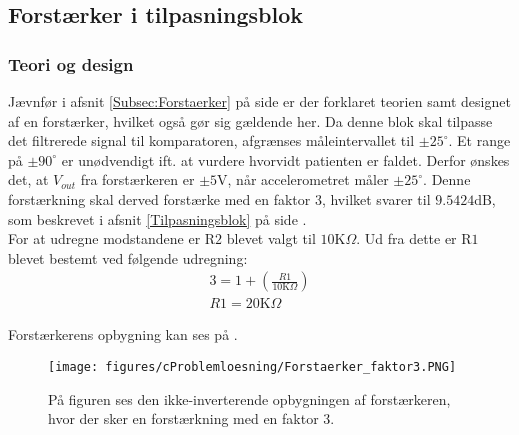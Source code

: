 \subsection{Forstærker i tilpasningsblok}
\subsubsection{Teori og design}
Jævnfør i afsnit \ref{Subsec:Forstaerker} på side \pageref{Subsec:Forstaerker} er der forklaret teorien samt designet af en forstærker, hvilket også gør sig gældende her. Da denne blok skal tilpasse det filtrerede signal til komparatoren, afgrænses måleintervallet til $\pm25^{\circ}$. Et range på $\pm90^{\circ}$ er unødvendigt ift. at vurdere hvorvidt patienten er faldet. Derfor ønskes det, at $V_{out}$ fra forstærkeren er $\pm5$V, når accelerometret måler $\pm25^{\circ}$. Denne forstærkning skal derved forstærke med en faktor 3, hvilket svarer til $9.5424$dB, som beskrevet i afsnit \ref{Tilpasningsblok} på side \pageref{Tilpasningsblok}. \\
For at udregne modstandene er R$2$ blevet valgt til $10$K$\Omega$. Ud fra dette er R$1$ blevet bestemt ved følgende udregning:
\begin{align}
3 = 1 + (\frac{R1}{10\text{K}\Omega})\\
R1 = 20\text{K}\Omega
\end{align}

\noindent Forstærkerens opbygning kan ses på .
\begin{figure}[H]
	\centering
	\texttt{[image: figures/cProblemloesning/Forstaerker\_faktor3.PNG]}
	\caption{På figuren ses den ikke-inverterende opbygningen af forstærkeren, hvor der sker en forstærkning med en faktor $3$.}
	\label{fig:Forstaerker_faktor3}
\end{figure}

